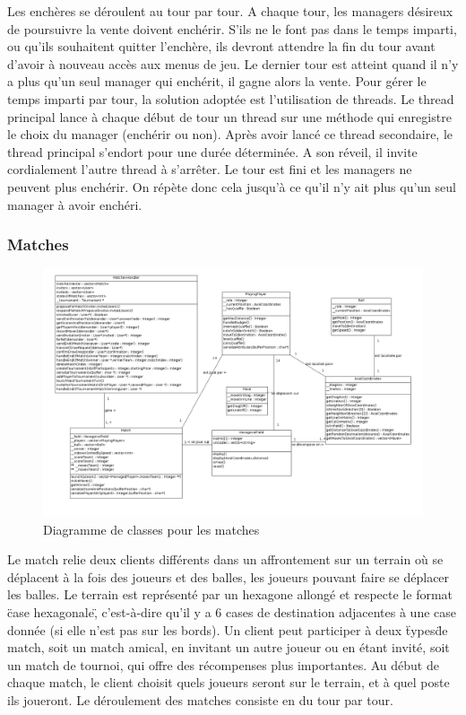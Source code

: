 \documentclass[a4paper,titlepage]{scrreprt}
\begin{document}
        Les enchères se déroulent au tour par tour. A chaque tour, les managers désireux de poursuivre la vente doivent enchérir. S'ils ne le font pas dans le temps imparti, ou qu'ils souhaitent quitter l'enchère, ils devront attendre la fin du tour avant d'avoir à nouveau accès aux menus de jeu. Le dernier tour est atteint quand il n'y a plus qu'un seul manager qui enchérit, il gagne alors la vente.
        Pour gérer le temps imparti par tour, la solution adoptée est l'utilisation de threads. Le thread principal lance à chaque début de tour un thread sur une méthode qui enregistre le choix du manager (enchérir ou non). Après avoir lancé ce thread secondaire, le thread principal s'endort pour une durée déterminée. A son réveil, il invite cordialement l'autre thread à s'arrêter. Le tour est fini et les managers ne peuvent plus enchérir. On répète donc cela jusqu'à ce qu'il n'y ait plus qu'un seul manager à avoir enchéri.

      \subsubsection{Matches}
          \begin{figure}[H]
          \includegraphics[scale=0.35]{uml/class/Match.png}
         \caption{Diagramme de classes pour les matches}
         \end{figure}

            Le match relie deux clients différents dans un affrontement sur un \gls{terrain} où se déplacent à la fois des joueurs et des balles, les joueurs pouvant faire se déplacer les balles. Le terrain est représenté par un hexagone allongé et respecte le format \"case hexagonale\", c'est-à-dire qu'il y a 6 cases de destination adjacentes à une case donnée (si elle n'est pas sur les bords). Un client peut participer à deux \"types\" de match, soit un match amical, en invitant un autre joueur ou en étant invité, soit un match de tournoi, qui offre des récompenses plus importantes. Au début de chaque match, le client choisit quels joueurs seront sur le terrain, et à quel poste ils joueront. Le déroulement des matches consiste en du tour par tour.
\end{document}
